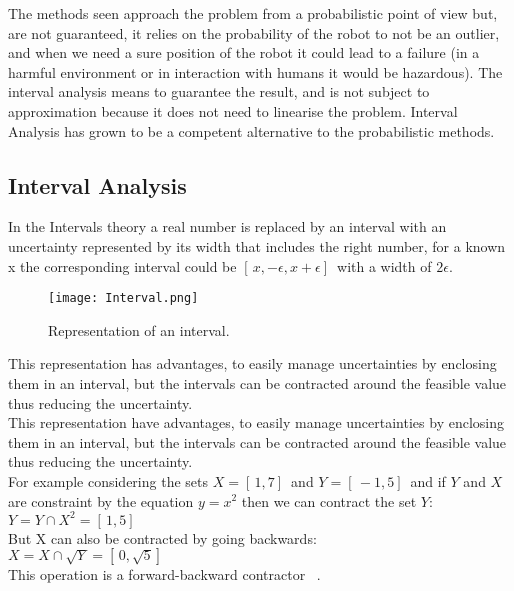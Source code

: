 The methods seen approach the problem from a probabilistic point of view but, are not guaranteed, it relies on the probability of the robot to not be an outlier, and when we need a sure position of the robot it could lead to a failure (in a harmful environment or in interaction with humans it would be hazardous). The interval analysis means to guarantee the result, and is not subject to approximation because it does not need to linearise the problem. Interval Analysis has grown to be a competent alternative to the probabilistic methods.

\subsection{Interval Analysis}

In the Intervals theory a real number is replaced by an interval with an uncertainty represented by its width that includes the right number, for a known x the corresponding interval could be $[ \,x,-\epsilon,x+\epsilon] \,$ with a width of $2\epsilon$.

\begin{figure}[H]
\centering
    \texttt{[image: Interval.png]} 
    \caption{Representation of an interval.}
    \label{fig:interExample}
\end{figure}

This representation has advantages, to easily manage uncertainties by enclosing them in an interval, but the intervals can be contracted around the feasible value thus reducing the uncertainty.\\

This representation have advantages, to easily manage uncertainties by enclosing them in an interval, but the intervals can be contracted around the feasible value thus reducing the uncertainty.\\
For example considering the sets $X=[\,1,7]\,$ and $Y=[\,-1,5]\,$ and if $Y$ and $X$ are constraint by the equation $y=x^{2}$ then we can contract the set $Y$:\\

$Y = Y\cap X^{2} =[\,1,5]\,$\\

But X can also be contracted by going backwards:\\

$X=X\cap \sqrt{Y} =[\,0,\sqrt{5}]\,$\\

This operation is a forward-backward contractor ~\cite{jaulin2001applied}.

